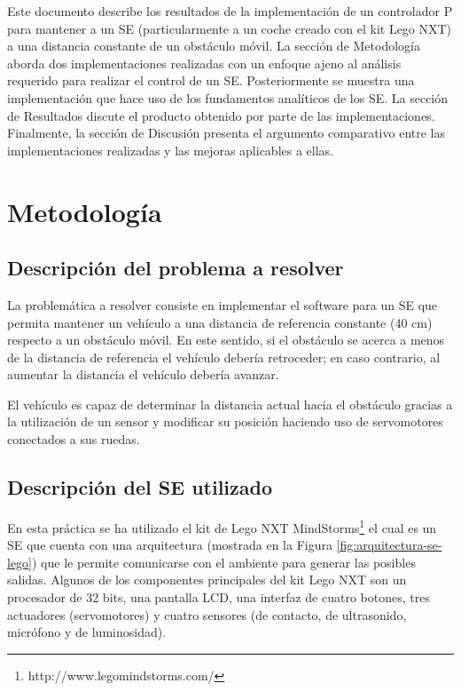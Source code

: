 \documentclass[journal]{IEEEtran}
\begin{document}
Este documento describe los resultados de la implementación de un controlador P para mantener a un SE (particularmente a un coche creado con el kit Lego NXT) a una distancia constante de un obstáculo móvil.
La sección de Metodología aborda dos implementaciones realizadas con un enfoque ajeno al análisis requerido para realizar el control de un SE.
Posteriormente se muestra una implementación que hace uso de los fundamentos analíticos de los SE.
La sección de Resultados discute el producto obtenido por parte de las implementaciones.
Finalmente, la sección de Discusión presenta el argumento comparativo entre las implementaciones realizadas y las mejoras aplicables a ellas.

\section{Metodología}
\label{sec:metodologia}

\subsection{Descripción del problema a resolver}
\label{sub:descripcion_problema}
La problemática a resolver consiste en implementar el software para un SE que permita mantener un vehículo a una distancia de referencia constante (40 cm) respecto a un obstáculo móvil.
En este sentido, si el obstáculo se acerca a menos de la distancia de referencia el vehículo debería retroceder; en caso contrario, al aumentar la distancia el vehículo debería avanzar.

El vehículo es capaz de determinar la distancia actual hacia el obstáculo gracias a la utilización de un sensor y modificar su posición haciendo uso de servomotores conectados a sus ruedas.

\subsection{Descripción del SE utilizado}
\label{sub:metodologia-descripcion-SE}
En esta práctica se ha utilizado el kit de Lego NXT MindStorms\footnote{http://www.legomindstorms.com/} el cual es un SE que cuenta con una arquitectura (mostrada en la Figura \ref{fig:arquitectura-se-lego}) que le permite comunicarse con el ambiente para generar las posibles salidas.
Algunos de los componentes principales del kit Lego NXT son un procesador de 32 bits, una pantalla LCD, una interfaz de cuatro botones, tres actuadores (servomotores) y cuatro sensores (de contacto, de ultrasonido, micrófono y de luminosidad).
\end{document}
